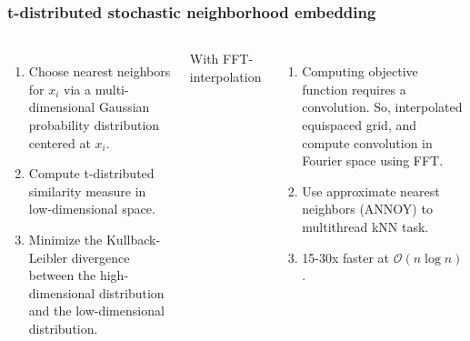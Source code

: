 \documentclass{beamer}
\begin{document}
\begin{frame}[t]
  \frametitle{t-distributed stochastic neighborhood embedding}

  \begin{columns}

    \begin{enumerate}
      \item Choose nearest neighbors for $x_i$ via a multi-dimensional Gaussian probability distribution centered at $x_i$.
      \item Compute t-distributed similarity measure in low-dimensional space.
      \item Minimize the Kullback-Leibler divergence between the high-dimensional distribution and the low-dimensional distribution.
    \end{enumerate}



    With FFT-interpolation

    \begin{enumerate}
      \item Computing objective function requires a convolution.
       So, interpolated equispaced grid, and compute convolution
       in Fourier space using FFT.
       \item Use approximate nearest neighbors (ANNOY) to multithread kNN task.
       \item 15-30x faster at $\mathcal{O}(n \log n)$.
    \end{enumerate}

  \end{columns}

\end{frame}

\end{document}

